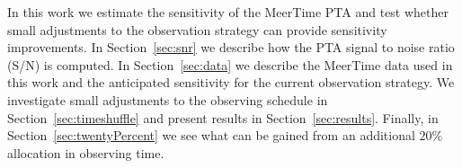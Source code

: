 In this work we estimate the sensitivity of the MeerTime PTA and test whether small adjustments to the observation strategy can provide sensitivity improvements. 
In Section~\ref{sec:snr} we describe how the PTA signal to noise ratio (S/N) is computed.
In Section~\ref{sec:data} we describe the MeerTime data used in this work and the anticipated sensitivity for the current observation strategy. 
We investigate small adjustments to the observing schedule in Section~\ref{sec:timeshuffle} and present results in Section~\ref{sec:results}.
Finally, in Section~\ref{sec:twentyPercent} we see what can be gained from an additional $20\%$ allocation in observing time. 




